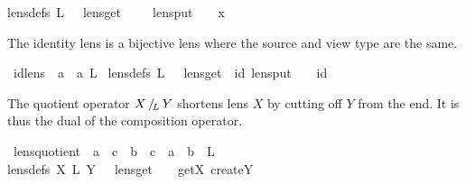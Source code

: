 \begin{isabellebody}
{\isacharbrackleft}lens{\isacharunderscore}defs{\isacharbrackright}{\isacharcolon}\ {\isachardoublequoteopen}{}\isactrlsub L\ {\isacharequal}\ {\isasymlparr}\ lens{\isacharunderscore}get\ {\isacharequal}\ {\isacharparenleft}{\isasymlambda}\ {\isacharunderscore}{\isachardot}\ {\isacharparenleft}{\isacharparenright}{\isacharparenright}{\isacharcomma}\ lens{\isacharunderscore}put\ {\isacharequal}\ {\isacharparenleft}{\isasymlambda}\ {\isasymsigma}\ x{\isachardot}\ {\isasymsigma}{\isacharparenright}\ {\isasymrparr}{\isachardoublequoteclose}%
\begin{isamarkuptext}%
The identity lens is a bijective lens where the source and view type are the same.%
\end{isamarkuptext}\isamarkuptrue%
\isamarkupfalse%
\ id{\isacharunderscore}lens\ {\isacharcolon}{\isacharcolon}\ {\isachardoublequoteopen}{\isacharprime}a\ {\isasymLongrightarrow}\ {\isacharprime}a{\isachardoublequoteclose}\ {\isacharparenleft}{\isachardoublequoteopen}{}\isactrlsub L{\isachardoublequoteclose}{\isacharparenright}\ \isanewline
{\isacharbrackleft}lens{\isacharunderscore}defs{\isacharbrackright}{\isacharcolon}\ {\isachardoublequoteopen}{}\isactrlsub L\ {\isacharequal}\ {\isasymlparr}\ lens{\isacharunderscore}get\ {\isacharequal}\ id{\isacharcomma}\ lens{\isacharunderscore}put\ {\isacharequal}\ {\isacharparenleft}{\isasymlambda}\ {\isacharunderscore}{\isachardot}\ id{\isacharparenright}\ {\isasymrparr}{\isachardoublequoteclose}%
\begin{isamarkuptext}%
The quotient operator $X \mathop{/\!_{L}} Y$ shortens lens $X$ by cutting off $Y$ from the end. It is
  thus the dual of the composition operator.%
\end{isamarkuptext}\isamarkuptrue%
\isamarkupfalse%
\ lens{\isacharunderscore}quotient\ {\isacharcolon}{\isacharcolon}\ {\isachardoublequoteopen}{\isacharparenleft}{\isacharprime}a\ {\isasymLongrightarrow}\ {\isacharprime}c{\isacharparenright}\ {\isasymRightarrow}\ {\isacharparenleft}{\isacharprime}b\ {\isasymLongrightarrow}\ {\isacharprime}c{\isacharparenright}\ {\isasymRightarrow}\ {\isacharprime}a\ {\isasymLongrightarrow}\ {\isacharprime}b{\isachardoublequoteclose}\ {\isacharparenleft}\ {\isachardoublequoteopen}{\isacharprime}{\isacharslash}\isactrlsub L{\isachardoublequoteclose}\ {}{}{\isacharparenright}\ \isanewline
{\isacharbrackleft}lens{\isacharunderscore}defs{\isacharbrackright}{\isacharcolon}\ {\isachardoublequoteopen}X\ {\isacharslash}\isactrlsub L\ Y\ {\isacharequal}\ {\isasymlparr}\ lens{\isacharunderscore}get\ {\isacharequal}\ {\isasymlambda}\ {\isasymsigma}{\isachardot}\ get\isactrlbsub X\isactrlesub \ {\isacharparenleft}create\isactrlbsub Y\isactrlesub \ {\isasymsigma}{\isacharparenright}\isanewline

\end{isabellebody}
